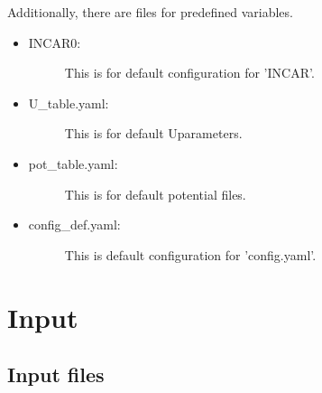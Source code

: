 \documentclass[letterpaper,10pt,english]{sphinxmanual}
\begin{document}
Additionally, there are files for predefined variables.
\begin{itemize}
\item {} \begin{description}
\item[{INCAR0:}] \leavevmode
This is for default configuration for ’INCAR’.

\end{description}

\item {} \begin{description}
\item[{U\_table.yaml:}] \leavevmode
This is for default Uparameters.

\end{description}

\item {} \begin{description}
\item[{pot\_table.yaml:}] \leavevmode
This is for default potential files.

\end{description}

\item {} \begin{description}
\item[{config\_def.yaml:}] \leavevmode
This is default configuration for ’config.yaml’.

\end{description}

\end{itemize}


\chapter{Input}
\label{\detokenize{Input/Input:input}}\label{\detokenize{Input/Input::doc}}

\section{Input files}
\label{\detokenize{Input/Input_files:input-files}}\label{\detokenize{Input/Input_files::doc}}
\end{document}
